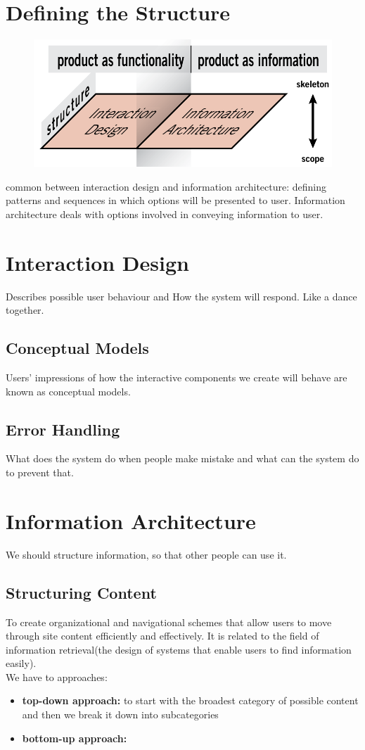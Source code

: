 \section{Defining the Structure}
\begin{figure}
    \centering
        \includegraphics[width=12cm]{images/pic6.png}    
    \caption{}
\end{figure}
common between interaction design and information architecture: defining patterns and sequences in which options will be presented to user.
Information architecture deals with options involved in conveying information to user.
\section{Interaction Design}
Describes possible user behaviour and How the system will respond. Like a dance together.
\subsection{Conceptual Models}
Users' impressions of how the interactive components we create will behave are known as conceptual models.
\subsection{Error Handling}
What does the system do when people make mistake and what can the system do to prevent that.
\section{Information Architecture}
We should structure information, so that other people can use it. 
\subsection{Structuring Content}
To create organizational and navigational schemes that allow users to move through site content efficiently and effectively. It is related to the field of information retrieval(the
 design of systems that enable users to find information easily). \\
 We have to approaches:
 \begin{itemize}
     \item \textbf{top-down approach: } to start with the broadest category of possible content and 
     then we break it down into subcategories
     \item \textbf{bottom-up approach: }
 \end{itemize}
